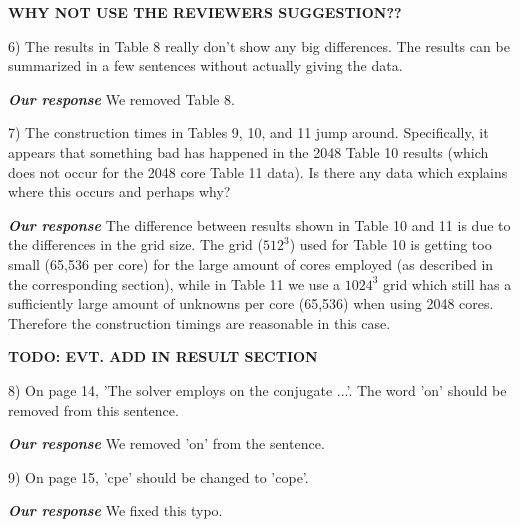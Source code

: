 \documentclass[10pt]{report}
\begin{document}
{\bf WHY NOT USE THE REVIEWERS SUGGESTION??}


6) The results in Table 8 really don't show any big differences. The results can
be summarized in a few sentences without actually giving the data.

{\it {\bf Our response}} We removed Table 8.

7) The construction times in Tables 9, 10, and 11 jump around. Specifically, it
appears that something bad has happened in the 2048 Table 10 results (which does
not occur for the 2048 core Table 11 data). Is there any data which explains
where this occurs and perhaps why?

{\it {\bf Our response}} The difference between results shown in Table 10 and 11
is due to the differences in the grid size. The grid ($512^3$) used for Table 10 is
getting too small (65,536 per core) for the large amount of cores employed (as
described in the corresponding section), while in Table 11 we use a $1024^3$
grid which still has a sufficiently large amount of unknowns per core (65,536)
when using 2048 cores. Therefore the construction timings are reasonable in this
case.

{\bf TODO: EVT. ADD IN RESULT SECTION}

8) On page 14, 'The solver employs on the conjugate ...'. The word 'on' should
be removed from this sentence.

{\it {\bf Our response}}  We removed 'on' from the sentence. 

9) On page 15, 'cpe' should be changed to 'cope'.

{\it {\bf Our response}}  We fixed this typo.
\end{document}
